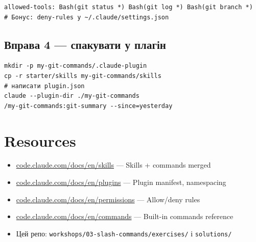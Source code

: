 \documentclass[11pt,a4paper]{article}
\begin{document}
\begin{lstlisting}
allowed-tools: Bash(git status *) Bash(git log *) Bash(git branch *)
# Бонус: deny-rules у ~/.claude/settings.json
\end{lstlisting}

\subsection{Вправа 4 --- спакувати у плагін}

\begin{lstlisting}
mkdir -p my-git-commands/.claude-plugin
cp -r starter/skills my-git-commands/skills
# написати plugin.json
claude --plugin-dir ./my-git-commands
/my-git-commands:git-summary --since=yesterday
\end{lstlisting}

\section{Resources}

\begin{itemize}
\item \href{https://code.claude.com/docs/en/skills}{code.claude.com/docs/en/skills} --- Skills + commands merged
\item \href{https://code.claude.com/docs/en/plugins}{code.claude.com/docs/en/plugins} --- Plugin manifest, namespacing
\item \href{https://code.claude.com/docs/en/permissions}{code.claude.com/docs/en/permissions} --- Allow/deny rules
\item \href{https://code.claude.com/docs/en/commands}{code.claude.com/docs/en/commands} --- Built-in commands reference
\item Цей репо: \texttt{workshops/03-slash-commands/exercises/} і \texttt{solutions/}
\end{itemize}
\end{document}
